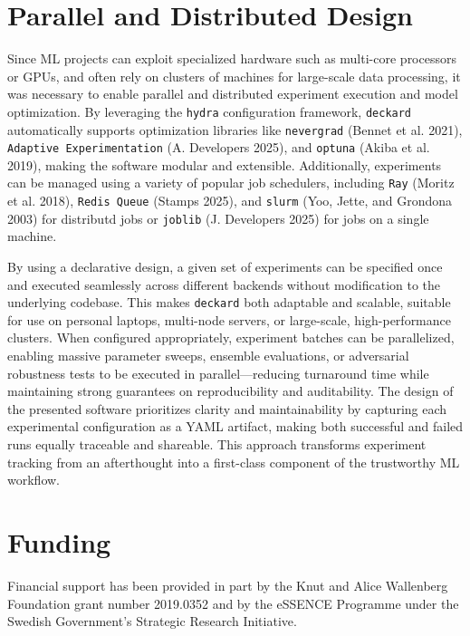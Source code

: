 \documentclass[
]{article}
\begin{document}
\hypertarget{parallel-and-distributed-design}{%
\section{Parallel and Distributed
Design}\label{parallel-and-distributed-design}}

Since ML projects can exploit specialized hardware such as multi-core
processors or GPUs, and often rely on clusters of machines for
large-scale data processing, it was necessary to enable parallel and
distributed experiment execution and model optimization. By leveraging
the \texttt{hydra} configuration framework, \texttt{deckard}
automatically supports optimization libraries like \texttt{nevergrad}
(Bennet et al. 2021), \texttt{Adaptive\ Experimentation} (A. Developers
2025), and \texttt{optuna} (Akiba et al. 2019), making the software
modular and extensible. Additionally, experiments can be managed using a
variety of popular job schedulers, including \texttt{Ray} (Moritz et al.
2018), \texttt{Redis\ Queue} (Stamps 2025), and \texttt{slurm} (Yoo,
Jette, and Grondona 2003) for distributd jobs or \texttt{joblib} (J.
Developers 2025) for jobs on a single machine.

By using a declarative design, a given set of experiments can be
specified once and executed seamlessly across different backends without
modification to the underlying codebase. This makes \texttt{deckard}
both adaptable and scalable, suitable for use on personal laptops,
multi-node servers, or large-scale, high-performance clusters. When
configured appropriately, experiment batches can be parallelized,
enabling massive parameter sweeps, ensemble evaluations, or adversarial
robustness tests to be executed in parallel---reducing turnaround time
while maintaining strong guarantees on reproducibility and auditability.
The design of the presented software prioritizes clarity and
maintainability by capturing each experimental configuration as a YAML
artifact, making both successful and failed runs equally traceable and
shareable. This approach transforms experiment tracking from an
afterthought into a first-class component of the trustworthy ML
workflow.

\hypertarget{funding}{%
\section{Funding}\label{funding}}

Financial support has been provided in part by the Knut and Alice
Wallenberg Foundation grant number 2019.0352 and by the eSSENCE
Programme under the Swedish Government's Strategic Research Initiative.
\end{document}
